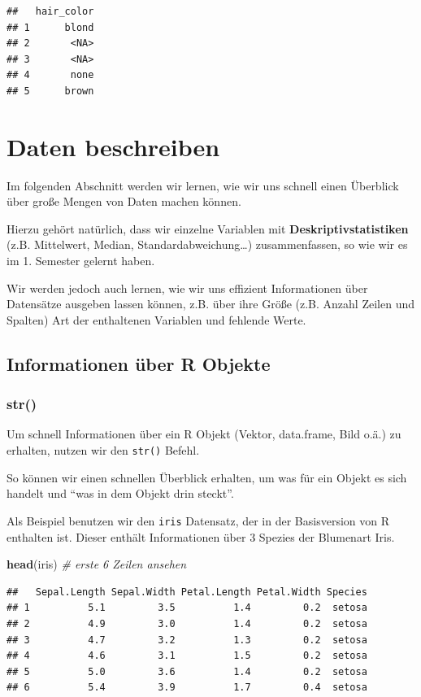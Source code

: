 \documentclass[
]{book}
\newenvironment{Shaded}{\begin{snugshade}}{\end{snugshade}}
\newcommand{\CommentTok}[1]{\textcolor[rgb]{0.56,0.35,0.01}{\textit{#1}}}
\newcommand{\FunctionTok}[1]{\textcolor[rgb]{0.13,0.29,0.53}{\textbf{#1}}}
\newcommand{\NormalTok}[1]{#1}
\newcounter{none} %
\begin{document}
\begin{verbatim}
##   hair_color
## 1      blond
## 2       <NA>
## 3       <NA>
## 4       none
## 5      brown
\end{verbatim}

\chapter{Daten beschreiben}\label{daten-beschreiben}

Im folgenden Abschnitt werden wir lernen, wie wir uns schnell einen Überblick über große Mengen von Daten machen können.

Hierzu gehört natürlich, dass wir einzelne Variablen mit \textbf{Deskriptivstatistiken} (z.B. Mittelwert, Median, Standardabweichung\ldots) zusammenfassen, so wie wir es im 1. Semester gelernt haben.

Wir werden jedoch auch lernen, wie wir uns effizient Informationen über Datensätze ausgeben lassen können, z.B. über ihre Größe (z.B. Anzahl Zeilen und Spalten) Art der enthaltenen Variablen und fehlende Werte.

\section{Informationen über R Objekte}\label{informationen-uxfcber-r-objekte}

\subsection{str()}\label{str}

Um schnell Informationen über ein R Objekt (Vektor, data.frame, Bild o.ä.) zu erhalten, nutzen wir den \texttt{str()} Befehl.

So können wir einen schnellen Überblick erhalten, um was für ein Objekt es sich handelt und ``was in dem Objekt drin steckt''.

Als Beispiel benutzen wir den \texttt{iris} Datensatz, der in der Basisversion von R enthalten ist. Dieser enthält Informationen über 3 Spezies der Blumenart Iris.

\begin{Shaded}
\begin{Highlighting}[]
\FunctionTok{head}\NormalTok{(iris) }\CommentTok{\# erste 6 Zeilen ansehen}
\end{Highlighting}
\end{Shaded}

\begin{verbatim}
##   Sepal.Length Sepal.Width Petal.Length Petal.Width Species
## 1          5.1         3.5          1.4         0.2  setosa
## 2          4.9         3.0          1.4         0.2  setosa
## 3          4.7         3.2          1.3         0.2  setosa
## 4          4.6         3.1          1.5         0.2  setosa
## 5          5.0         3.6          1.4         0.2  setosa
## 6          5.4         3.9          1.7         0.4  setosa
\end{verbatim}
\end{document}
